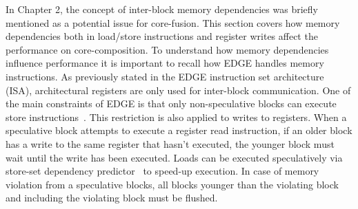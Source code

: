 In Chapter 2, the concept of inter-block memory dependencies was briefly mentioned as a potential issue for core-fusion.
This section covers how memory dependencies both in load/store instructions and register writes affect the performance on core-composition.
To understand how memory dependencies influence performance it is important to recall how EDGE handles memory instructions.
As previously stated in the EDGE instruction set architecture (ISA), architectural registers are only used for inter-block communication.
One of the main constraints of EDGE is that only non-speculative blocks can execute store instructions~\cite{smith2006compilingedge}.
This restriction is also applied to writes to registers.
When a speculative block attempts to execute a register read instruction, if an older block has a write to the same register that hasn't executed, the younger block must wait until the write has been executed.
Loads can be executed speculatively via store-set dependency predictor~\cite{chrysos1998storesets, smith2006compilingedge} to speed-up execution.
In case of memory violation from a speculative blocks, all blocks younger than the violating block and including the violating block must be flushed.

